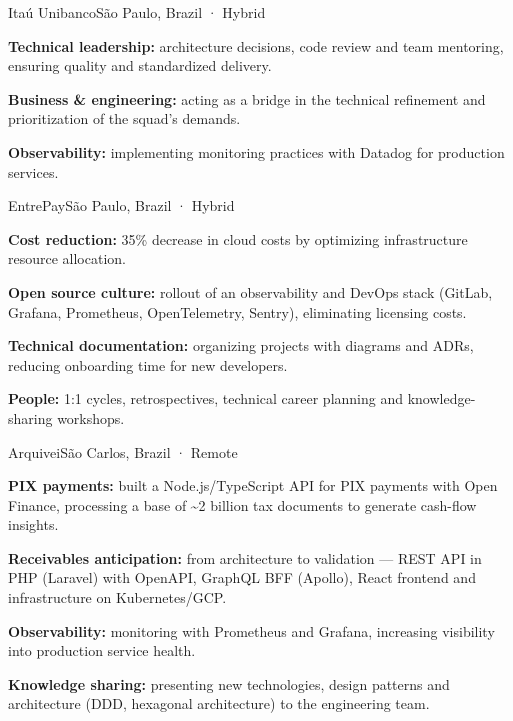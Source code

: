 \documentclass{resume}
\begin{document}
        {Itaú Unibanco}{São Paulo, Brazil · Hybrid}
\begin{cvitems}
  \item \textbf{Technical leadership:} architecture decisions, code review and team
        mentoring, ensuring quality and standardized delivery.
  \item \textbf{Business \& engineering:} acting as a bridge in the technical refinement
        and prioritization of the squad's demands.
  \item \textbf{Observability:} implementing monitoring practices with Datadog for
        production services.
\end{cvitems}

        {EntrePay}{São Paulo, Brazil · Hybrid}
\begin{cvitems}
  \item \textbf{Cost reduction:} 35\% decrease in cloud costs by optimizing
        infrastructure resource allocation.
  \item \textbf{Open source culture:} rollout of an observability and DevOps stack
        (GitLab, Grafana, Prometheus, OpenTelemetry, Sentry), eliminating licensing costs.
  \item \textbf{Technical documentation:} organizing projects with diagrams and ADRs,
        reducing onboarding time for new developers.
  \item \textbf{People:} 1:1 cycles, retrospectives, technical career planning and
        knowledge-sharing workshops.
\end{cvitems}

        {Arquivei}{São Carlos, Brazil · Remote}
\begin{cvitems}
  \item \textbf{PIX payments:} built a Node.js/TypeScript API for PIX payments with
        Open Finance, processing a base of \textasciitilde2 billion tax documents to
        generate cash-flow insights.
  \item \textbf{Receivables anticipation:} from architecture to validation — REST API in
        PHP (Laravel) with OpenAPI, GraphQL BFF (Apollo), React frontend and
        infrastructure on Kubernetes/GCP.
  \item \textbf{Observability:} monitoring with Prometheus and Grafana, increasing
        visibility into production service health.
  \item \textbf{Knowledge sharing:} presenting new technologies, design patterns and
        architecture (DDD, hexagonal architecture) to the engineering team.
\end{cvitems}
\end{document}
